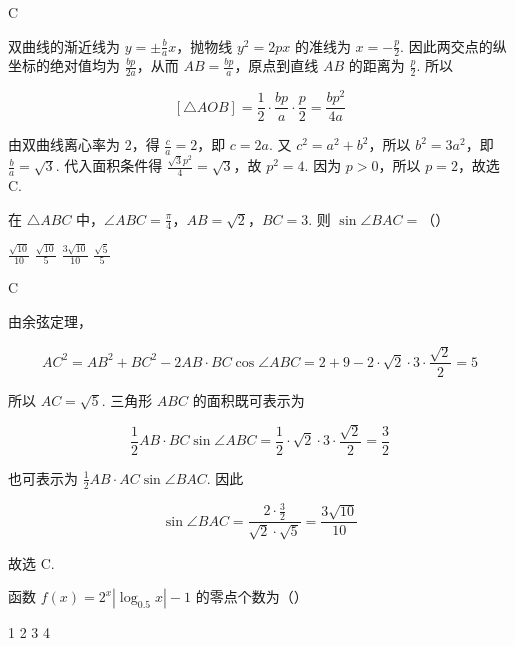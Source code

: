 \begin{answer}
C
\end{answer}

\begin{solution}
双曲线的渐近线为 \(y=\pm\frac{b}{a}x\)，抛物线 \(y^2=2px\) 的准线为 \(x=-\frac{p}{2}\). 因此两交点的纵坐标的绝对值均为 \(\frac{bp}{2a}\)，从而 \(AB=\frac{bp}{a}\)，原点到直线 \(AB\) 的距离为 \(\frac{p}{2}\). 所以

\[
[\triangle AOB]=\frac{1}{2}\cdot\frac{bp}{a}\cdot\frac{p}{2}=\frac{bp^2}{4a}
\]

由双曲线离心率为 \(2\)，得 \(\frac{c}{a}=2\)，即 \(c=2a\). 又 \(c^2=a^2+b^2\)，所以 \(b^2=3a^2\)，即 \(\frac{b}{a}=\sqrt{3}\). 代入面积条件得 \(\frac{\sqrt{3}p^2}{4}=\sqrt{3}\)，故 \(p^2=4\). 因为 \(p>0\)，所以 \(p=2\)，故选 C.
\end{solution}

\begin{problem}
在 \(\triangle ABC\) 中，\(\angle ABC = \frac{\pi}{4}\)，\(AB = \sqrt{2}\)，\(BC = 3\). 则 \(\sin \angle BAC =\)（\quad）

\choices
    {\(\frac{\sqrt{10}}{10}\)}
    {\(\frac{\sqrt{10}}{5}\)}
    {\(\frac{3\sqrt{10}}{10}\)}
    {\(\frac{\sqrt{5}}{5}\)}
\end{problem}

\begin{answer}
C
\end{answer}

\begin{solution}
由余弦定理，

\[
AC^2=AB^2+BC^2-2AB\cdot BC\cos\angle ABC
=2+9-2\cdot\sqrt{2}\cdot3\cdot\frac{\sqrt{2}}{2}=5
\]

所以 \(AC=\sqrt{5}\). 三角形 \(ABC\) 的面积既可表示为

\[
\frac{1}{2}AB\cdot BC\sin\angle ABC
=\frac{1}{2}\cdot\sqrt{2}\cdot3\cdot\frac{\sqrt{2}}{2}=\frac{3}{2}
\]

也可表示为 \(\frac{1}{2}AB\cdot AC\sin\angle BAC\). 因此

\[
\sin\angle BAC=\frac{2\cdot\frac{3}{2}}{\sqrt{2}\cdot\sqrt{5}}
=\frac{3\sqrt{10}}{10}
\]

故选 C.
\end{solution}

\begin{problem}
函数 \( f(x) = 2^{x} |\log_{0.5} x| - 1 \) 的零点个数为（\quad）

\choices
    {1}
    {2}
    {3}
    {4}
\end{problem}

